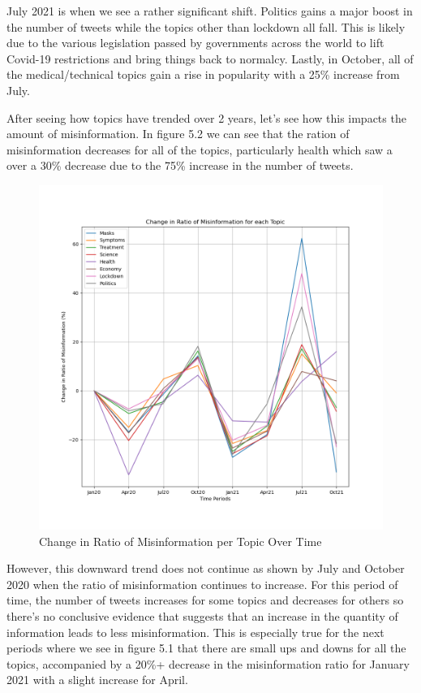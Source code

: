 \documentclass{l4proj}
\begin{document}
July 2021 is when we see a rather significant shift. Politics gains a major boost in the number of tweets while the topics other than lockdown all fall. This is likely due to the various legislation passed by governments across the world to lift Covid-19 restrictions and bring things back to normalcy. Lastly, in October, all of the medical/technical topics gain a rise in popularity with a 25\% increase from July.

After seeing how topics have trended over 2 years, let's see how this impacts the amount of misinformation. In figure 5.2 we can see that the ration of misinformation decreases for all of the topics, particularly health which saw a over a 30\% decrease due to the 75\% increase in the number of tweets.

\begin{figure}[h]
    \centering
    \includegraphics[width=1.0\linewidth]{images/topicMisinfo.png}
    \caption{Change in Ratio of Misinformation per Topic Over Time}
\end{figure}

However, this downward trend does not continue as shown by July and October 2020 when the ratio of misinformation continues to increase. For this period of time, the number of tweets increases for some topics and decreases for others so there's no conclusive evidence that suggests that an increase in the quantity of information leads to less misinformation. This is especially true for the next periods where we see in figure 5.1 that there are small ups and downs for all the topics, accompanied by a 20\%+ decrease in the misinformation ratio for January 2021 with a slight increase for April.
\end{document}
